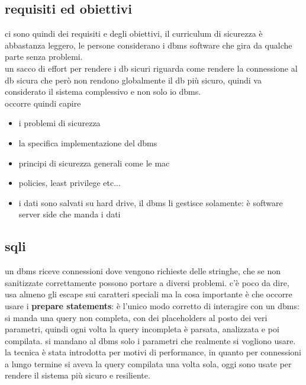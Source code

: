 \documentclass[12pt, oneside]{extbook} %
\begin{document}
\subsection{requisiti ed obiettivi}
ci sono quindi dei requisiti e degli obiettivi, il curriculum di sicurezza è abbastanza leggero, le persone considerano i dbms software che gira da qualche parte senza problemi.\\un sacco di effort per rendere i db sicuri riguarda come rendere la connessione al db sicura che però non rendono globalmente il db più sicuro, quindi va considerato il sistema complessivo e non solo io dbms.\\occorre quindi capire 
\begin{itemize}
	\item i problemi di sicurezza
	\item la specifica implementazione del dbms
	\item principi di sicurezza generali come le mac
	\item policies, least privilege etc...
	\item i dati sono salvati su hard drive, il dbms li gestisce solamente: è software server side che manda i dati
\end{itemize}

\subsection{sqli}
un dbms riceve connessioni dove vengono richieste delle stringhe, che se non sanitizzate correttamente possono portare a diversi problemi. c'è poco da dire, usa almeno gli escape sui caratteri speciali ma la cosa importante è che occorre usare i \textbf{prepare statements}: è l'unico modo corretto di interagire con un dbms: si manda una query non completa, con dei placeholders al posto dei veri parametri, quindi ogni volta la query incompleta è parsata, analizzata e poi compilata. si mandano al dbms solo i parametri che realmente si vogliono usare. la tecnica è stata introdotta per motivi di performance, in quanto per connessioni a lungo termine si aveva la query compilata una volta sola, oggi sono usate per rendere il sistema più sicuro e resiliente.
\end{document}
